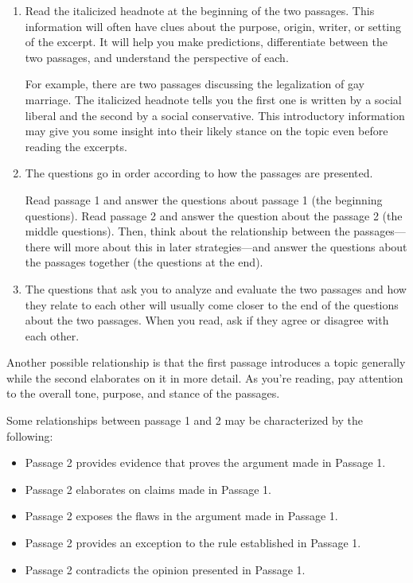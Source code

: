 \begin{enumerate}[leftmargin=0cm,labelwidth=\itemindent,labelsep=0cm,align=left,label={\bfseries Strategy \#\arabic*:\ }]
\item Read the italicized headnote at the beginning of the two passages.  This information will often have clues about the purpose, origin, writer, or setting of the excerpt.  It will help you make predictions, differentiate between the two passages, and understand the perspective of each.

\bigskip
For example, there are two passages discussing the legalization of gay marriage.  The italicized headnote tells you the first one is written by a social liberal and the second by a social conservative.  This introductory information may give you some insight into their likely stance on the topic even before reading the excerpts.  

\item The questions go in order according to how the passages are presented. 

\bigskip
Read passage 1 and answer the questions about passage 1 (the beginning questions). Read passage 2 and answer the question about the passage 2 (the middle questions). Then, think about the relationship between the passages—there will more about this in later strategies—and answer the questions about the passages together (the questions at the end).

\item The questions that ask you to analyze and evaluate the two passages and how they relate to each other will usually come closer to the end of the questions about the two passages.  When you read, ask if they agree or disagree with each other.  
\end{enumerate}

\bigskip
Another possible relationship is that the first passage introduces a topic generally while the second elaborates on it in more detail.  As you're reading, pay attention to the overall tone, purpose, and stance of the passages.

\bigskip
Some relationships between passage 1 and 2 may be characterized by the following:

\begin{itemize}
\item Passage 2 provides evidence that proves the argument made in Passage 1.
\item Passage 2 elaborates on claims made in Passage 1.
\item Passage 2 exposes the flaws in the argument made in Passage 1.
\item Passage 2 provides an exception to the rule established in Passage 1.
\item Passage 2 contradicts the opinion presented in Passage 1.
\end{itemize}

